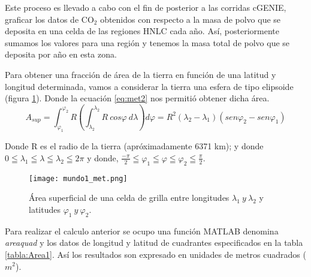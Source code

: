 Este proceso es llevado a cabo con el fin de posterior a las corridas cGENIE, graficar los datos de CO$_2$ obtenidos con respecto a la masa de polvo que se deposita en una celda de las regiones HNLC cada año. Así, posteriormente sumamos los valores para una regi\'on y tenemos la masa total de polvo que se deposita por año en esta zona. 

Para obtener una fracci\'on de \'area de la tierra en funci\'on de una latitud y longitud determinada, vamos a considerar la tierra una esfera de tipo
  elipsoide (figura \ref{fig:mundo1_met}). Donde la ecuaci\'on \ref{eq:met2} nos permiti\'o obtener dicha \'area. 
  \begin{equation} \label{eq:met2}
   A_{sup}=\displaystyle\int_{\varphi_1}^{\varphi_2} R \left( \displaystyle\int_{\lambda_2}^{\lambda_2} R\ cos\varphi\ d\lambda \right) d\varphi = R^{2} 
  \left(\lambda_2 - \lambda_1 \right) \left(sen\varphi_2 - sen\varphi_1 \right) 
  \end{equation}
  
   Donde R es el radio de la tierra (apr\'oximadamente 6371 km); y donde\\
   $ 0\leqq \lambda_1 \leqq \lambda \leqq \lambda_2 \leqq 2\pi $ y donde, $ \frac{-\pi}{2} \leqq \varphi_1 \leqq \varphi \leqq \varphi_2 \leqq \frac{\pi}{2}$.
  
  \begin{figure}[H]
  \centering
  \texttt{[image: mundo1\_met.png]}
  \caption[Área superficial de una grilla]{\'Area superficial de una celda de grilla entre longitudes $ \lambda_1\ y\ \lambda_2 $ y latitudes $ \varphi_1\ y\ \varphi_2$.}
  \label{fig:mundo1_met}
\end{figure}

 Para realizar el calculo anterior se ocupo una funci\'on MATLAB denomina \textit{areaquad} y los datos de longitud y latitud de cuadrantes especificados en
 la tabla \ref{tabla:Area1}. As\'i los resultados son expresado en unidades de metros cuadrados ($m^{2}$).

 \newpage


